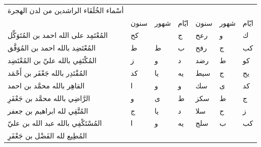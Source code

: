 \documentclass[11pt]{article}
\newcommand{\AbjadZero}{{\NallinoSigns\symbol{"E000}}}
\begin{document}
\begin{Arabic}
\setlength{\tabcolsep}{2pt}\noindent\begin{tabular}{|b{\dimexpr\textwidth-60mm\relax}|>{\centering\arraybackslash}p{6.5mm}|>{\centering\arraybackslash}p{6.5mm}|>{\centering\arraybackslash}p{6.5mm}||>{\centering\arraybackslash}p{6.5mm}|>{\centering\arraybackslash}p{6.5mm}|>{\centering\arraybackslash}p{6.5mm}|}\hline
\parbox[b]{\dimexpr\textwidth-60mm\relax}{\centering\small أسْماء الخُلَفَاء الراشدين من لدن الهجرة} &  &  \\ 
 & {\scriptsize سنون} & {\scriptsize شهور} & {\scriptsize ايّام} & {\scriptsize سنون} & {\scriptsize شهور} & {\scriptsize ايّام} \\ \hline
{}المُعْتَمِد على الله احمد بن المُتَوَكِّل & كح & \AbjadZero{} & ج & رعح & و & ك \\
{}المُعْتَضِد بالله احمد بن المُوَفَّق & ط & ط & ب & رفح & ج & كب \\
{}المُكْتَفِي بالله عليّ بن المُعْتَضِد & ز & و & د & رضد & ط & كو \\
{}المُقْتَدِر بالله جَعْفَر بن أَحْمَد & كد & يا & يه & سيط & ج & يح \\
{}القاهِر بالله محمَّد بن احمد & ا & و & و & سك & ى & كد \\
{}الرَّاضِي بالله محمَّد بن جَعْفَرِ & و & ى & ط & سكز & ط & ج \\
{}المُتَّقِي لله ابراهيم بن جعفر & ج & يا & د & سلا & ح & ز \\
{}المُسْتَكْفِي بالله عبد الله بن عليّ & ا & و & يه & سلج & ب & كب \\
{}المُطِيع لله الفَضْل بن جَعْفَرِ &  &  &  &  &  &  \\
\hline\end{tabular}
\end{Arabic}
\end{document}
